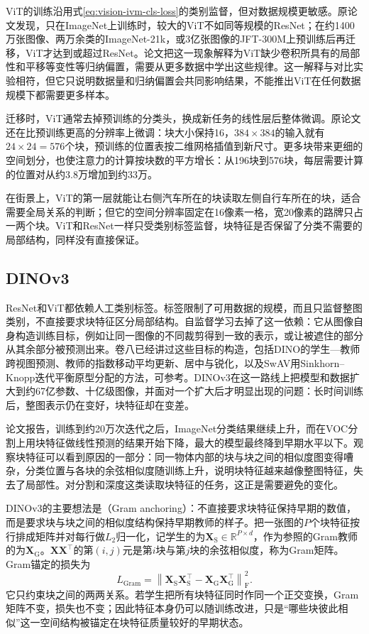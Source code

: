 ViT的训练沿用式\eqref{eq:vision-ivm-cls-loss}的类别监督，但对数据规模更敏感。原论文发现，只在ImageNet上训练时，较大的ViT不如同等规模的ResNet；在约1400万张图像、两万余类的ImageNet-21k，或3亿张图像的JFT-300M上预训练后再迁移，ViT才达到或超过ResNet。论文把这一现象解释为ViT缺少卷积所具有的局部性和平移等变性等归纳偏置，需要从更多数据中学出这些规律。这一解释与对比实验相符，但它只说明数据量和归纳偏置会共同影响结果，不能推出ViT在任何数据规模下都需要更多样本。

迁移时，ViT通常去掉预训练的分类头，换成新任务的线性层后整体微调。原论文还在比预训练更高的分辨率上微调：块大小保持16，$384\times384$的输入就有$24\times24=576$个块，预训练的位置表按二维网格插值到新尺寸。更多块带来更细的空间划分，也使注意力的计算按块数的平方增长：从196块到576块，每层需要计算的位置对从约3.8万增加到约33万。

在街景上，ViT的第一层就能让右侧汽车所在的块读取左侧自行车所在的块，适合需要全局关系的判断；但它的空间分辨率固定在16像素一格，宽20像素的路牌只占一两个块。ViT和ResNet一样只受类别标签监督，块特征是否保留了分类不需要的局部结构，同样没有直接保证。

\subsection{DINOv3}
\label{sec:vision-ivm-dinov3}

ResNet和ViT都依赖人工类别标签。标签限制了可用数据的规模，而且只监督整图类别，不直接要求块特征区分局部结构。自监督学习去掉了这一依赖：它从图像自身构造训练目标，例如让同一图像的不同裁剪得到一致的表示，或让被遮住的部分从其余部分被预测出来。卷八已经讲过这些目标的构造，包括DINO的学生—教师跨视图预测、教师的指数移动平均更新、居中与锐化，以及SwAV用Sinkhorn--Knopp迭代平衡原型分配的方法，可参考。DINOv3在这一路线上把模型和数据扩大到约67亿参数、十亿级图像，并面对一个扩大后才明显出现的问题：长时间训练后，整图表示仍在变好，块特征却在变差。

论文报告，训练到约20万次迭代之后，ImageNet分类结果继续上升，而在VOC分割上用块特征做线性预测的结果开始下降，最大的模型最终降到早期水平以下。观察块特征可以看到原因的一部分：同一物体内部的块与块之间的相似度图变得嘈杂，分类位置与各块的余弦相似度随训练上升，说明块特征越来越像整图特征，失去了局部性。对分割和深度这类读取块特征的任务，这正是需要避免的变化。

DINOv3的主要想法是（Gram anchoring）：不直接要求块特征保持早期的数值，而是要求块与块之间的相似度结构保持早期教师的样子。把一张图的$P$个块特征按行排成矩阵并对每行做$L_2$归一化，记学生的为$\bm X_{\mathrm S}\in\mathbb R^{P\times d}$，作为参照的Gram教师的为$\bm X_{\mathrm G}$。$\bm X\bm X^\top$的第$(i,j)$元是第$i$块与第$j$块的余弦相似度，称为Gram矩阵。Gram锚定的损失为
\begin{equation}
  L_{\mathrm{Gram}}
  =\left\lVert\bm X_{\mathrm S}\bm X_{\mathrm S}^\top
  -\bm X_{\mathrm G}\bm X_{\mathrm G}^\top\right\rVert_{\mathrm F}^2.
  \label{eq:vision-ivm-gram}
\end{equation}
它只约束块之间的两两关系。若学生把所有块特征同时作同一个正交变换，Gram矩阵不变，损失也不变；因此特征本身仍可以随训练改进，只是“哪些块彼此相似”这一空间结构被锚定在块特征质量较好的早期状态。

